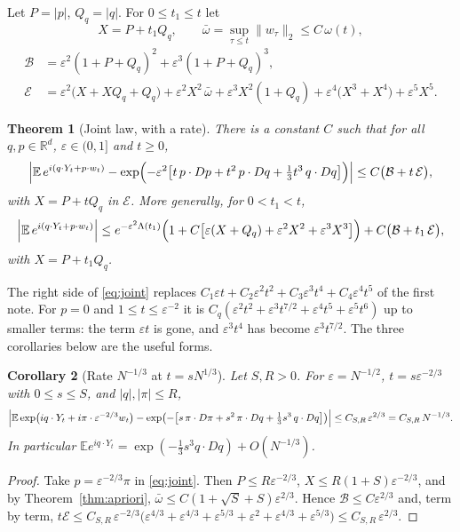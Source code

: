 \documentclass[11pt]{article}
\newcommand{\E}{\mathbb{E}}
\newcommand{\eps}{\varepsilon}
\newcommand{\nrm}[2]{\|#1\|_{#2}}
\newtheorem{theorem}{Theorem}
\newtheorem{corollary}[theorem]{Corollary}
\theoremstyle{remark}
\begin{document}
Let $P=|p|$, $Q_q = |q|$. For $0\le t_1\le t$ let
\[
  X = P + t_1Q_q,\qquad \bar\omega = \sup_{\tau\le t}\nrm{w_\tau}{2}
  \le C\,\omega(t),
\]
\begin{align*}
  \mathcal{B} &= \eps^2(1+P+Q_q)^2 + \eps^3(1+P+Q_q)^3,\\
  \mathcal{E} &= \eps^2\bigl(X + XQ_q + Q_q\bigr) + \eps^2X^2\,\bar\omega
     + \eps^3X^2(1+Q_q) + \eps^4\bigl(X^3+X^4\bigr) + \eps^5X^5 .
\end{align*}

\begin{theorem}[Joint law, with a rate]\label{thm:joint}
There is a constant $C$ such that for all $q,p\in\mathbb{R}^d$,
$\eps\in(0,1]$ and $t\ge0$,
\begin{equation}
  \Bigl|\E\,e^{i(q\cdot Y_t + p\cdot w_t)}
    - \exp\Bigl(-\eps^2\bigl[t\,p\cdot Dp + t^2\,p\cdot Dq
       + \tfrac13t^3\,q\cdot Dq\bigr]\Bigr)\Bigr|
  \le C\bigl(\mathcal{B} + t\,\mathcal{E}\bigr),
  \label{eq:joint}
\end{equation}
with $X = P+tQ_q$ in $\mathcal{E}$. More generally, for $0<t_1<t$,
\begin{equation}
  \Bigl|\E\,e^{i(q\cdot Y_t + p\cdot w_t)}\Bigr|
  \le e^{-\eps^2\Lambda(t_1)}\Bigl(1 + C\bigl[\eps(X+Q_q) + \eps^2X^2 + \eps^3X^3\bigr]\Bigr)
   + C\bigl(\mathcal{B} + t_1\,\mathcal{E}\bigr),
  \label{eq:window}
\end{equation}
with $X = P + t_1Q_q$.
\end{theorem}

The right side of \eqref{eq:joint} replaces
$C_1\eps t + C_2\eps^2t^2 + C_3\eps^3t^4 + C_4\eps^4t^5$ of the first note.
For $p=0$ and $1\le t\le\eps^{-2}$ it is
$C_q(\eps^2t^2 + \eps^3t^{7/2} + \eps^4t^5 + \eps^5t^6)$ up to smaller terms:
the term $\eps t$ is gone, and $\eps^3t^4$ has become $\eps^3t^{7/2}$.
The three corollaries below are the useful forms.

\begin{corollary}[Rate $N^{-1/3}$ at $t = sN^{1/3}$]\label{cor:third}
Let $S,R>0$. For $\eps = N^{-1/2}$, $t = s\eps^{-2/3}$ with $0\le s\le S$,
and $|q|,|\pi|\le R$,
\[
  \Bigl|\E\exp\bigl(iq\cdot Y_t + i\pi\cdot\eps^{-2/3}w_t\bigr)
   - \exp\bigl(-\bigl[s\,\pi\cdot D\pi + s^2\,\pi\cdot Dq
     + \tfrac13s^3\,q\cdot Dq\bigr]\bigr)\Bigr|
  \le C_{S,R}\,\eps^{2/3} = C_{S,R}\,N^{-1/3}.
\]
In particular
$\E e^{iq\cdot Y_t} = \exp(-\tfrac13s^3q\cdot Dq) + O(N^{-1/3})$.
\end{corollary}

\begin{proof}
Take $p = \eps^{-2/3}\pi$ in \eqref{eq:joint}. Then
$P\le R\eps^{-2/3}$, $X\le R(1+S)\eps^{-2/3}$, and by
Theorem~\ref{thm:apriori}, $\bar\omega\le C(1+\sqrt S+S)\eps^{2/3}$. Hence
$\mathcal{B}\le C\eps^{2/3}$ and, term by term,
$t\mathcal{E}\le C_{S,R}\,\eps^{-2/3}\bigl(\eps^{4/3} + \eps^{4/3}
+ \eps^{5/3} + \eps^{2} + \eps^{4/3} + \eps^{5/3}\bigr)\le C_{S,R}\,\eps^{2/3}$.
\end{proof}
\end{document}
